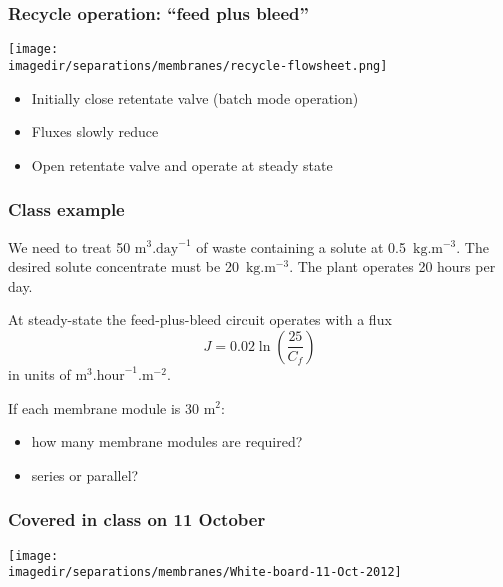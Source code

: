 \begin{frame}\frametitle{Recycle operation: ``feed plus bleed''}
	\begin{center}
		\texttt{[image: \\imagedir/separations/membranes/recycle-flowsheet.png]}
	\end{center}
	\begin{itemize}
		\item	Initially close retentate valve (batch mode operation)
		\item	Fluxes slowly reduce
		\item	Open retentate valve and operate at steady state
	\end{itemize}
\end{frame}

\begin{frame}\frametitle{Class example}
	We need to treat 50 $\text{m}^3\text{.day}^{-1}$ of waste containing a solute at 0.5~$\text{kg}\text{.m}^{-3}$. The desired solute concentrate must be 20~$\text{kg}\text{.m}^{-3}$. The plant operates 20 hours per day.
	
	\vspace{12pt}
	At steady-state the feed-plus-bleed circuit operates with a flux 
	\[
		J = 0.02 \ln \left(\frac{25}{C_f} \right)
	\]
	in units of $\text{m}^3.\text{hour}^{-1}.\text{m}^{-2}$.
	
	\vspace{12pt}
	If each membrane module is 30 m$^2$:	
	\begin{itemize}
		\item	how many membrane modules are required?
		\item	series or parallel?
	\end{itemize}
\end{frame}

\begin{frame}\frametitle{Covered in class on 11 October}
	\begin{center}
		\texttt{[image: \\imagedir/separations/membranes/White-board-11-Oct-2012]}
	\end{center}
\end{frame}

